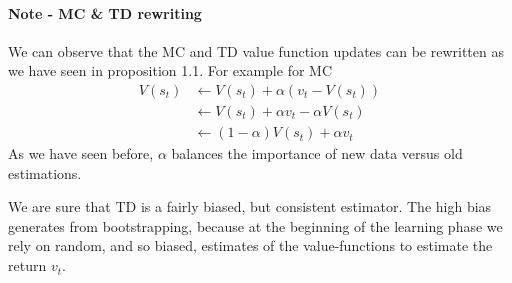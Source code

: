 \documentclass[../main.tex]{subfiles}
\begin{document}
\paragraph{Note - MC \& TD rewriting} We can observe that the MC and TD value function updates can be rewritten as we have seen in proposition 1.1.
For example for MC
\begin{align*}
    V(s_t) & \leftarrow V(s_t) + \alpha(v_t-V(s_t))        \\
           & \leftarrow V(s_t) + \alpha v_t- \alpha V(s_t) \\
           & \leftarrow (1-\alpha)V(s_t) + \alpha v_t
\end{align*}
As we have seen before, $\alpha$ balances the importance of new data versus old estimations.
\newline
\par
\noindent
We are sure that TD is a fairly biased, but consistent estimator. The high bias generates from bootstrapping, because at the beginning of the learning phase we rely on random, and so biased, estimates of the value-functions to estimate the return $v_t$.
\end{document}
